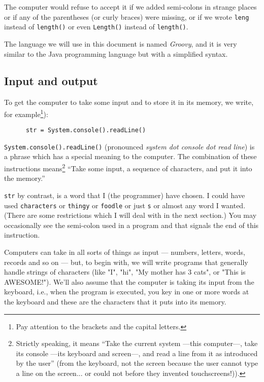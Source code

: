 The computer would refuse to accept it if we added semi-colons in strange places
or if any of the parentheses (or curly braces) were missing, or if we wrote
\verb!leng! instead of \verb!length()! or even \verb!Length()! instead of \verb!length()!.

The language we will use in this document is named \emph{Groovy}, and
it is very similar to the Java programming language but with a
simplified syntax. 

\subsection{Input and output}

To get the computer to take some input and to store it
in its memory, we write, for example\footnote{Pay attention to the brackets
and the capital letters.}):

\begin{Verbatim}
      str = System.console().readLine()
\end{Verbatim}

\verb!System.console().readLine()! (pronounced \emph{system dot
  console dot read line}) is a phrase which has a special meaning to
the computer. The combination of these instructions
means\footnote{Strictly speaking, it means ``Take the current system
  ---this computer---, take its console ---its keyboard and screen---,
and read a line from it as introduced by the user'' (from the keyboard,
not the screen because the user cannot type a line on the screen... or
could not before they invented touchscreens!)).} ``Take
some input, a sequence of characters, and put it into the memory.''

\verb!str! by contrast, is a word that I (the programmer) have chosen.
I could have used \verb!characters! or \verb!thingy! or \verb!foodle!
or just \verb!s! or almost any word I wanted. (There are some
restrictions which I will deal with in the next section.)  You may
occasionally see the semi-colon used in a program and that signals the
end of this instruction.

Computers can take in all sorts of things as input --- numbers,
letters, words, records and so on --- but, to begin with, we will
write programs that generally handle strings of characters (like
"I", "hi", "My mother has 3 cats", or "This is AWESOME!").
We'll also assume that the computer is taking its input from the
keyboard, i.e., when the program is executed, you key in one or more
words at the keyboard and these are the characters that it puts into
its memory.

